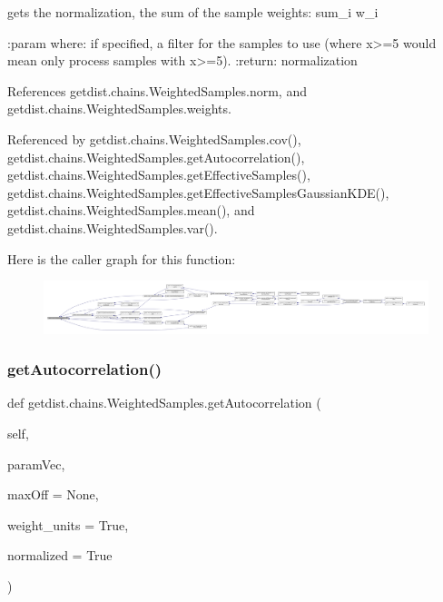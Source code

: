 \begin{DoxyVerb}gets the normalization, the sum of the sample weights: sum_i w_i

:param where: if specified, a filter for the samples to use (where x>=5 would mean only process samples with x>=5).
:return: normalization
\end{DoxyVerb}
 

References getdist.\+chains.\+Weighted\+Samples.\+norm, and getdist.\+chains.\+Weighted\+Samples.\+weights.



Referenced by getdist.\+chains.\+Weighted\+Samples.\+cov(), getdist.\+chains.\+Weighted\+Samples.\+get\+Autocorrelation(), getdist.\+chains.\+Weighted\+Samples.\+get\+Effective\+Samples(), getdist.\+chains.\+Weighted\+Samples.\+get\+Effective\+Samples\+Gaussian\+K\+D\+E(), getdist.\+chains.\+Weighted\+Samples.\+mean(), and getdist.\+chains.\+Weighted\+Samples.\+var().

Here is the caller graph for this function\+:
\nopagebreak
\begin{figure}[H]
\begin{center}
\leavevmode
\includegraphics[width=350pt]{classgetdist_1_1chains_1_1WeightedSamples_adb6da75221743f7a05286cbb2b2685b0_icgraph}
\end{center}
\end{figure}
\mbox{\label{classgetdist_1_1chains_1_1WeightedSamples_a3635437a603d5c30394f83039c821859}} 
\subsubsection{\texorpdfstring{get\+Autocorrelation()}{getAutocorrelation()}}
{\footnotesize\ttfamily def getdist.\+chains.\+Weighted\+Samples.\+get\+Autocorrelation (\begin{DoxyParamCaption}\item[{}]{self,  }\item[{}]{param\+Vec,  }\item[{}]{max\+Off = {\ttfamily None},  }\item[{}]{weight\+\_\+units = {\ttfamily True},  }\item[{}]{normalized = {\ttfamily True} }\end{DoxyParamCaption})}

